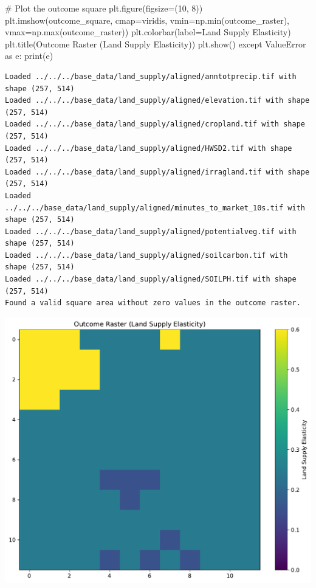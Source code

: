 \documentclass[
  letterpaper,
]{article}
\newenvironment{Shaded}{\begin{snugshade}}{\end{snugshade}}
\newcommand{\BuiltInTok}[1]{\textcolor[rgb]{0.00,0.23,0.31}{#1}}
\newcommand{\CommentTok}[1]{\textcolor[rgb]{0.37,0.37,0.37}{#1}}
\newcommand{\ControlFlowTok}[1]{\textcolor[rgb]{0.00,0.23,0.31}{#1}}
\newcommand{\DecValTok}[1]{\textcolor[rgb]{0.68,0.00,0.00}{#1}}
\newcommand{\ImportTok}[1]{\textcolor[rgb]{0.00,0.46,0.62}{#1}}
\newcommand{\NormalTok}[1]{\textcolor[rgb]{0.00,0.23,0.31}{#1}}
\newcommand{\OperatorTok}[1]{\textcolor[rgb]{0.37,0.37,0.37}{#1}}
\newcommand{\PreprocessorTok}[1]{\textcolor[rgb]{0.68,0.00,0.00}{#1}}
\newcommand{\StringTok}[1]{\textcolor[rgb]{0.13,0.47,0.30}{#1}}
\begin{document}
\begin{Shaded}
\begin{Highlighting}[]
    \CommentTok{\# Plot the outcome square}
\NormalTok{    plt.figure(figsize}\OperatorTok{=}\NormalTok{(}\DecValTok{10}\NormalTok{, }\DecValTok{8}\NormalTok{))}
\NormalTok{    plt.imshow(outcome\_square, cmap}\OperatorTok{=}\StringTok{\textquotesingle{}viridis\textquotesingle{}}\NormalTok{, vmin}\OperatorTok{=}\NormalTok{np.}\BuiltInTok{min}\NormalTok{(outcome\_raster), vmax}\OperatorTok{=}\NormalTok{np.}\BuiltInTok{max}\NormalTok{(outcome\_raster))}
\NormalTok{    plt.colorbar(label}\OperatorTok{=}\StringTok{\textquotesingle{}Land Supply Elasticity\textquotesingle{}}\NormalTok{)}
\NormalTok{    plt.title(}\StringTok{\textquotesingle{}Outcome Raster (Land Supply Elasticity)\textquotesingle{}}\NormalTok{)}
\NormalTok{    plt.show()}
\ControlFlowTok{except} \PreprocessorTok{ValueError} \ImportTok{as}\NormalTok{ e:}
    \BuiltInTok{print}\NormalTok{(e)}
\end{Highlighting}
\end{Shaded}

\begin{verbatim}
Loaded ../../../base_data/land_supply/aligned/anntotprecip.tif with shape (257, 514)
Loaded ../../../base_data/land_supply/aligned/elevation.tif with shape (257, 514)
Loaded ../../../base_data/land_supply/aligned/cropland.tif with shape (257, 514)
Loaded ../../../base_data/land_supply/aligned/HWSD2.tif with shape (257, 514)
Loaded ../../../base_data/land_supply/aligned/irragland.tif with shape (257, 514)
Loaded ../../../base_data/land_supply/aligned/minutes_to_market_10s.tif with shape (257, 514)
Loaded ../../../base_data/land_supply/aligned/potentialveg.tif with shape (257, 514)
Loaded ../../../base_data/land_supply/aligned/soilcarbon.tif with shape (257, 514)
Loaded ../../../base_data/land_supply/aligned/SOILPH.tif with shape (257, 514)
Found a valid square area without zero values in the outcome raster.
\end{verbatim}

\includegraphics{mvp02_files/figure-pdf/cell-5-output-2.pdf}
\end{document}
